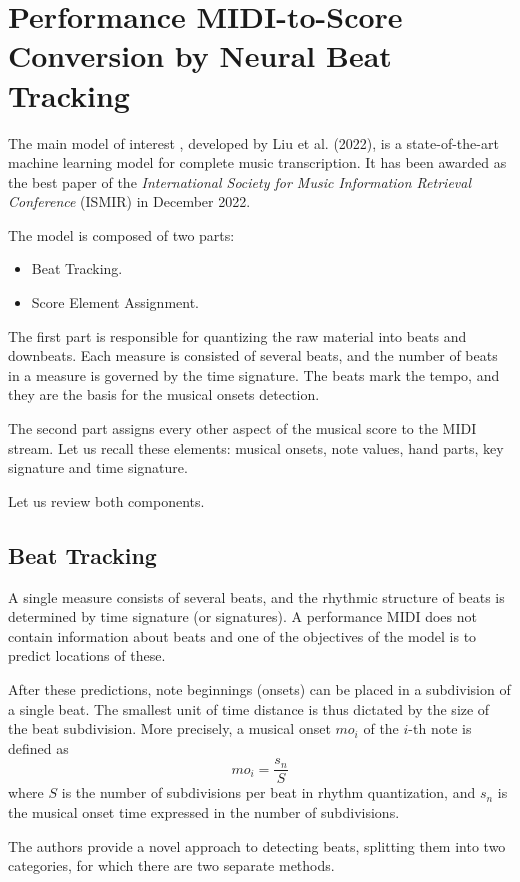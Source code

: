 \chapter{Performance MIDI-to-Score Conversion by Neural Beat Tracking}

The main model of interest \cite{Liu2022}, developed by Liu et al. (2022), is a state-of-the-art machine learning model for complete music transcription. It has been awarded as the best paper of the \emph{International Society for Music Information Retrieval Conference} (ISMIR) in December 2022.

The model is composed of two parts:
\begin{itemize}
	\item Beat Tracking.
	\item Score Element Assignment.
\end{itemize}

The first part is responsible for quantizing the raw material into beats and downbeats. Each measure is consisted of several beats, and the number of beats in a measure is governed by the time signature. The beats mark the tempo, and they are the basis for the musical onsets detection.

The second part assigns every other aspect of the musical score to the MIDI stream. Let us recall these elements: musical onsets, note values, hand parts, key signature and time signature.

Let us review both components.

\section{Beat Tracking}

A single measure consists of several beats, and the rhythmic structure of beats is determined by time signature (or signatures). A performance MIDI does not contain information about beats and one of the objectives of the model is to predict locations of these.

After these predictions, note beginnings (onsets) can be placed in a subdivision of a single beat. The smallest unit of time distance is thus dictated by the size of the beat subdivision. More precisely, a musical onset $mo_i$ of the $i$-th note is defined as \[mo_i = \frac{s_n}{S}\] where $S$ is the number of subdivisions per beat in rhythm quantization, and $s_n$ is the musical onset time expressed in the number of subdivisions.

The authors provide a novel approach to detecting beats, splitting them into two categories, for which there are two separate methods.

